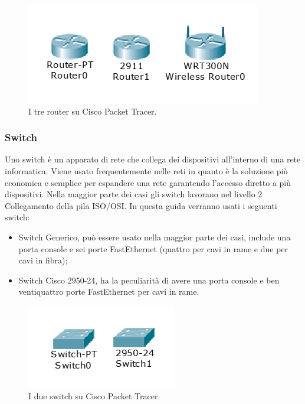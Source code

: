 \begin{figure}[htbp]
    \centerline{\includegraphics[scale=.5]{images/02.packet-tracer/router.png}}
    \caption{I tre router su Cisco Packet Tracer.}
\end{figure}

\subsubsection{Switch}
Uno switch è un apparato di rete che collega dei dispositivi all'interno di una rete informatica. Viene usato frequentemente nelle reti in quanto è la soluzione più economica e semplice per espandere una rete garantendo l'accesso diretto a più dispositivi. Nella maggior parte dei casi gli switch lavorano nel livello 2 Collegamento della pila ISO/OSI. \newline
\smallskip
\newline
In questa guida verranno usati i seguenti switch:

\begin{itemize}
    \item Switch Generico, può essere usato nella maggior parte dei casi, include una porta console e sei porte FastEthernet (quattro per cavi in rame e due per cavi in fibra);
    \item Switch Cisco 2950-24, ha la peculiarità di avere una porta console e ben ventiquattro porte FastEthernet per cavi in rame.
\end{itemize}

\begin{figure}[htbp]
    \centerline{\includegraphics[scale=.5]{images/02.packet-tracer/switch.png}}
    \caption{I due switch su Cisco Packet Tracer.}
\end{figure}

